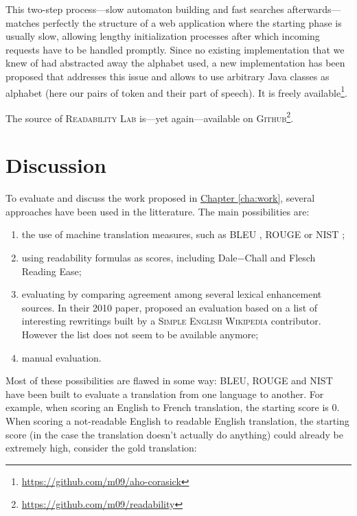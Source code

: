 \documentclass[a4paper, 11pt, onepage]{scrreprt}
\newcommand\sew{\textsc{Simple English Wikipedia}}
\newcommand\chapterref[1]{\hyperref[#1]{Chapter \ref*{#1}}}
\begin{document}
This two-step process—slow automaton building and fast searches
afterwards—matches perfectly the structure of a web application where
the starting phase is usually slow, allowing lengthy initialization
processes after which incoming requests have to be handled
promptly. Since no existing implementation that we knew of had
abstracted away the alphabet used, a new implementation has been
proposed that addresses this issue and allows to use arbitrary Java
classes as alphabet (here our pairs of token and their part of
speech). It is freely
available\footnote{\url{https://github.com/m09/aho-corasick}}.

The source of \textsc{Readability Lab} is—yet again—available on
\textsc{Github}\footnote{\url{https://github.com/m09/readability}}.

\chapter{Discussion}
\label{cha:discussion}

To evaluate and discuss the work proposed in \chapterref{cha:work},
several approaches have been used in the litterature. The main
possibilities are:

\begin{enumerate}
\item the use of machine translation measures, such as BLEU
  \cite{papineni2002bleu}, ROUGE \cite{lin2004rouge} or NIST
  \cite{doddington2002automatic};
\item using readability formulas as scores, including Dale−Chall and
  Flesch Reading Ease;
\item evaluating by comparing agreement among several lexical
  enhancement sources. In their 2010 paper, \cite{yatskar2010sake}
  proposed an evaluation based on a list of interesting rewritings
  built by a \sew{} contributor. However the list does not seem to be
  available anymore;
\item manual evaluation.
\end{enumerate}

Most of these possibilities are flawed in some way: BLEU, ROUGE and
NIST have been built to evaluate a translation from one language to
another. For example, when scoring an English to French translation,
the starting score is $0$. When scoring a not-readable English to
readable English translation, the starting score (in the case the
translation doesn't actually do anything) could already be extremely
high, consider the gold translation:
\end{document}
